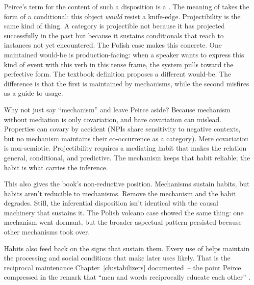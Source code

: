 Peirce's term for the content of such a disposition is a  \citep[CP~5.467]{peirce1931cp}. The meaning of  takes the form of a conditional: this object \emph{would} resist a knife-edge. Projectibility is the same kind of thing. A category is projectible not because it has projected successfully in the past but because it sustains conditionals that reach to instances not yet encountered. The Polish case makes this concrete. One maintained would-be is production-facing: when a speaker wants to express this kind of event with this verb in this tense frame, the system pulls toward the perfective form. The textbook definition proposes a different would-be. The difference is that the first is maintained by mechanisms, while the second misfires as a guide to usage.

Why not just say \enquote{mechanism} and leave Peirce aside? Because mechanism without mediation is only covariation, and bare covariation can mislead. Properties can covary by accident (NPIs share sensitivity to negative contexts, but no mechanism maintains their co-occurrence as a category). Mere covariation is non-semiotic. Projectibility requires a mediating habit that makes the relation general, conditional, and predictive. The mechanism keeps that habit reliable; the habit is what carries the inference.

This also gives the book's non-reductive position. Mechanisms sustain habits, but habits aren't reducible to mechanisms. Remove the mechanism and the habit degrades. Still, the inferential disposition isn't identical with the causal machinery that sustains it. The Polish volcano case showed the same thing: one mechanism went dormant, but the broader aspectual pattern persisted because other mechanisms took over.

Habits also feed back on the signs that sustain them. Every use of  helps maintain the processing and social conditions that make later uses likely. That is the reciprocal maintenance Chapter~\ref{ch:stabilizers} documented~-- the point Peirce compressed in the remark that \enquote{men and words reciprocally educate each other} \citep[CP~5.313]{peirce1931cp}.

